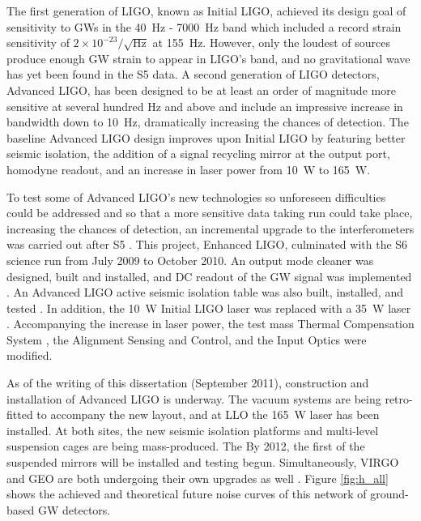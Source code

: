 The first generation of LIGO, known as Initial LIGO, achieved its
design goal of sensitivity to GWs in the 40~Hz - 7000~Hz band which
included a record strain sensitivity of
$2\times10^{-23}/\sqrt{\mathrm{Hz}}$ at 155~Hz. However, only the
loudest of sources produce enough GW strain to appear in LIGO's band,
and no gravitational wave has yet been found in the S5 data. A second
generation of LIGO detectors, Advanced LIGO, has been designed to be
at least an order of magnitude more sensitive at several hundred Hz
and above and include an impressive increase in bandwidth down to
10~Hz, dramatically increasing the chances of detection. The baseline
Advanced LIGO design \cite{AdvLigoSysDesign} improves upon Initial
LIGO by featuring better seismic isolation, the addition of a signal
recycling mirror at the output port, homodyne readout, and an increase
in laser power from 10~W to 165~W.

To test some of Advanced LIGO's new technologies so unforeseen
difficulties could be addressed and so that a more sensitive data
taking run could take place, increasing the chances of detection, an
incremental upgrade to the interferometers was carried out after S5
\cite{Adhikari2006Enhanced}. This project, Enhanced LIGO, culminated
with the S6 science run from July 2009 to October 2010.  An output
mode cleaner was designed, built and installed, and DC readout of the
GW signal was implemented \cite{Fricke2011DC}. An Advanced LIGO active
seismic isolation table was also built, installed, and tested
\cite[Ch. 5]{KisselThesis}. In addition, the 10~W Initial LIGO laser
was replaced with a 35~W laser
\cite{Frede2007Fundamental}. Accompanying the increase in laser power, 
the test mass Thermal Compensation System \cite{Willems2009Thermal},
the Alignment Sensing and Control, and the Input Optics were modified.

As of the writing of this dissertation (September 2011), construction
and installation of Advanced LIGO is underway. The vacuum systems are
being retro-fitted to accompany the new layout, and at LLO the 165~W
laser has been installed. At both sites, the new seismic isolation
platforms and multi-level suspension cages are being
mass-produced. The By 2012, the first of the suspended mirrors will be
installed and testing begun. Simultaneously, VIRGO and GEO are both
undergoing their own upgrades as well \cite{Acernese2008Virgo}
\cite{Luck2010Upgrade}. Figure \ref{fig:h_all} shows the achieved and
theoretical future noise curves of this network of ground-based GW
detectors.

